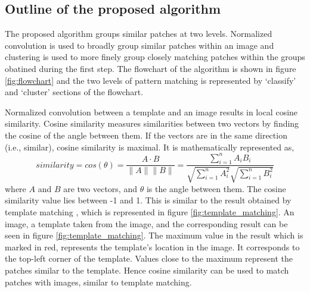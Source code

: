 \documentclass[fleqn,10pt]{wlscirep}
\begin{document}
\subsection*{Outline of the proposed algorithm}

The proposed algorithm groups similar patches at two levels. Normalized convolution is used to broadly group similar patches within an image and clustering is used to more finely group closely matching patches within the groups obatined during the first step. The flowchart of the algorithm is shown in figure \ref{fig:flowchart} and the two levels of pattern matching is represented by `classify' and `cluster' sections of the flowchart.

Normalized convolution between a template and an image results in local cosine similarity. Cosine similarity  measures similarities between two vectors\cite{alake_understanding_2021} by finding the cosine of the angle between them. If the vectors are in the same direction (i.e., similar), cosine similarity is maximal. It is mathematically represented as,
\begin{equation}
	similarity = cos(\theta) = \frac{A\cdot B}{\|A\|\|B\|} = \frac{\sum_{i=1}^{n}A_i B_i}{\sqrt{\sum_{i=1}^{n}A_i^2}\sqrt{\sum_{i=1}^{n}B_i^2}}
\end{equation}
where $A$ and $B$ are two vectors, and $\theta$ is the angle between them. The cosine similarity value lies between -1 and 1. This is similar to the result obtained by template matching , which is represented in figure \ref{fig:template_matching}. An image, a template taken from the image, and the corresponding result can be seen in figure \ref{fig:template_matching}. The maximum value in the result which is marked in red, represents the template’s location in the image. It corresponds to the top-left corner of the template. Values close to the maximum represent the patches similar to the template. Hence cosine similarity can be used to match patches with images, similar to template matching.

\end{document}
